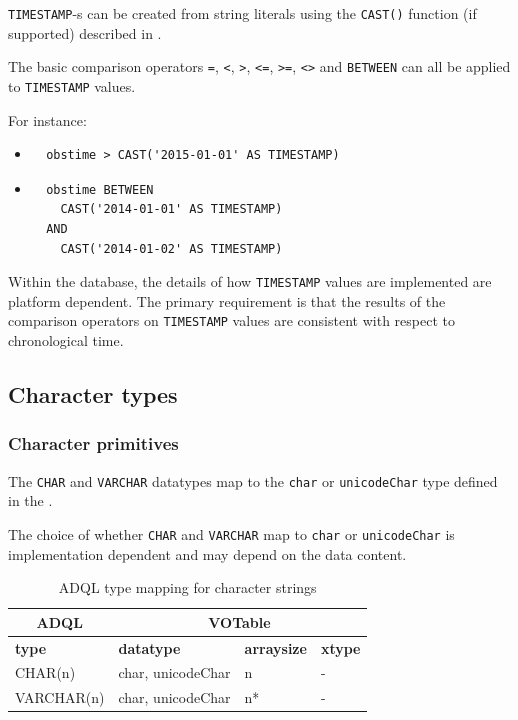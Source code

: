 \documentclass[11pt,a4paper]{ivoa}
\begin{document}
\verb:TIMESTAMP:-s can be created from string literals using the \verb:CAST(): function
(if supported) described in .

The basic comparison operators \verb:=:, \verb:<:, \verb:>:, \verb:<=:, \verb:>=:,
\verb:<>: and \verb:BETWEEN: can all be applied to \verb:TIMESTAMP: values.

For instance:
\begin{itemize}
    \item \begin{verbatim}
  obstime > CAST('2015-01-01' AS TIMESTAMP)
\end{verbatim}
    \item \begin{verbatim}
  obstime BETWEEN
    CAST('2014-01-01' AS TIMESTAMP)
  AND
    CAST('2014-01-02' AS TIMESTAMP)
    \end{verbatim}
\end{itemize}

Within the database, the details of how \verb:TIMESTAMP: values are implemented
are platform dependent. The primary requirement is that the results of the
comparison operators on \verb:TIMESTAMP: values are consistent with respect to
chronological time.

\subsection{Character types}
\label{sec:types.character}

\subsubsection{Character primitives}
\label{sec:types.character.primitive}

The \verb:CHAR: and \verb:VARCHAR: datatypes map to the \verb:char: or
\verb:unicodeChar: type defined in the \VOTableSpec{}.

The choice of whether \verb:CHAR: and \verb:VARCHAR: map to \verb:char: or
\verb:unicodeChar: is implementation dependent and may depend on the data
content.

\begin{table}[h]\footnotesize
    \begin{tabular}
        {|p{}|p{}|p{}|p{}|}

        \hline
        \multicolumn{1}{|c|}{\textbf{ADQL}} &
        \multicolumn{3}{|c|}{\textbf{VOTable}}
        \tabularnewline

        \hline
        \textbf{type} &
        \textbf{datatype} &
        \textbf{arraysize} &
        \textbf{xtype}
        \tabularnewline

        \hline
        CHAR(n) &
        char, unicodeChar &
        n &
        -
        \tabularnewline

        \hline
        VARCHAR(n) &
        char, unicodeChar &
        n* &
        -
        \tabularnewline
        \hline
    \end{tabular}
    \caption{ADQL type mapping for character strings}
    \label{table:types.character.primitive}
\end{table}
\end{document}
